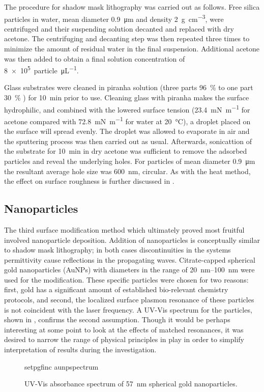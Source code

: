 The procedure for shadow mask lithography was carried out as follows.  Free
silica particles in water, mean diameter \SI{0.9}{\micro\meter} and density
\SI{2}{\gram\per\centi\meter\cubed}, were centrifuged and their suspending
solution decanted and replaced with dry acetone.  The centrifuging and
decanting step was then repeated three times to minimize the amount of
residual water in the final suspension.  Additional acetone was then added
to obtain a final solution concentration of
\SI{8e5}{particle\per\micro\liter}.  

Glass substrates were cleaned in piranha solution (three parts
\SI{96}{\percent}  to one part \SI{30}{\percent} ) for
\SI{10}{\minute} prior to use.  Cleaning glass with piranha makes the
surface hydrophilic, and combined with the lowered surface tension
(\SI{23.4}{\milli\newton\per\meter} for acetone compared with
\SI{72.8}{\milli\newton\per\meter} for water at \SI{20}{\celsius}), a
droplet placed on the surface will spread evenly.  The droplet was allowed
to evaporate in air and the sputtering process was then carried out as
usual.  Afterwards, sonicattion of the substrate for \SI{10}{\minute} in
dry acetone was sufficient to remove the adsorbed particles and reveal the
underlying holes.  For particles of mean diameter \SI{0.9}{\micro\meter}
the resultant average hole size was \SI{600}{\nano\meter}, circular.  As
with the heat method, the effect on surface roughness is further discussed
in .

\subsection{Nanoparticles}
The third surface modification method which ultimately proved most fruitful
involved nanoparticle deposition.  Addition of nanoparticles is
conceptually similar to shadow mask lithography; in both cases
discontinuities in the systems permittivity cause reflections in the
propagating waves.  Citrate-capped spherical gold nanoparticles (AuNPs)
with diameters in the range of \SIrange{20}{100}{\nano\meter} were used for
the modification.  These specific particles were chosen for two reasons:
first, gold has a significant amount of established bio-relevant chemistry
protocols, and second, the localized surface plasmon resonance of these
particles is not coincident with the laser frequency.  A UV-Vis spectrum
for the particles, shown in , confirms the second
assumption.  Though it would be perhaps interesting at some point to look
at the effects of matched resonances, it was desired to narrow the range of
physical principles in play in order to simplify interpretation of results
during the investigation.

\begin{figure}[ht]
 \centering
 {setpgfinc}
 {aunpspectrum}
 \caption{UV-Vis absorbance spectrum of \SI{57}{\nano\meter} spherical gold
 nanoparticles.}
\label{fig:aunpspectrum}
\end{figure}

